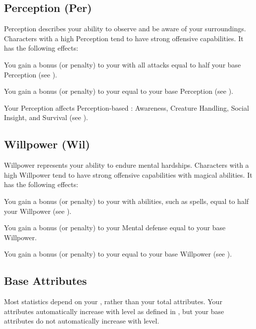     \subsection{Perception (Per)}\label{Perception}
        {
            Perception describes your ability to observe and be aware of your surroundings.
            Characters with a high Perception tend to have strong offensive capabilities.
            It has the following effects:
            \begin{raggeditemize}
                \item You gain a bonus (or penalty) to your  with all attacks equal to half your base Perception (see ).
                \item You gain a bonus (or penalty) to your  equal to your base Perception (see ).
                \item Your Perception affects Perception-based : Awareness, Creature Handling, Social Insight, and Survival (see ).
            \end{raggeditemize}
        }

    \subsection{Willpower (Wil)}\label{Willpower}
        {
            Willpower represents your ability to endure mental hardships.
            Characters with a high Willpower tend to have strong offensive capabilities with magical abilities.
            It has the following effects:
            \begin{raggeditemize}
                \item You gain a bonus (or penalty) to your  with  abilities, such as spells, equal to half your Willpower (see ).
                \item You gain a bonus (or penalty) to your Mental defense equal to your base Willpower.
                \item You gain a bonus (or penalty) to your  equal to your base Willpower (see ).
            \end{raggeditemize}
        }

    \subsection{Base Attributes}\label{Base Attributes}
        Most statistics depend on your , rather than your total attributes.
        Your attributes automatically increase with level as defined in , but your base attributes do not automatically increase with level.

